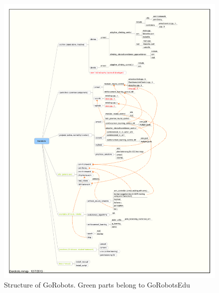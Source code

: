 \begin{figure}[h!]
 \begin{center}
  \includegraphics[width=14cm]{./pics/Gorobots.pdf}
 \end{center}
\caption{Structure of GoRobots. Green parts belong to GoRobotsEdu}
\label{struc3}
\end{figure}
